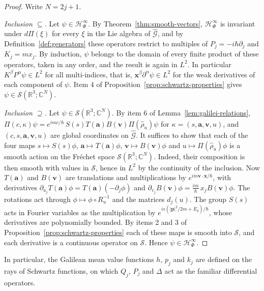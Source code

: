 \begin{proof}
	Write $N=2j+1$.
	
	\emph{Inclusion $\subseteq$.} Let $\psi\in\mathcal{H}^\infty_\Phi$. By Theorem~\ref{thm:smooth-vectors}, $\mathcal{H}^\infty_\Phi$ is invariant under $d\Pi(\xi)$ for every $\xi$ in the Lie algebra of $\widehat{\mathcal{G}}$, and by Definition~\ref{def:generators} these operators restrict to multiples of $P_j=-i\hbar\partial_j$ and $K_j=mx_j$. By induction, $\psi$ belongs to the domain of every finite product of these operators, taken in any order, and the result is again in $L^2$. In particular $K^\beta P^\alpha\psi\in L^2$ for all multi-indices, that is, $\mathbf{x}^\beta\partial^\alpha\psi\in L^2$ for the weak derivatives of each component of $\psi$. Item 4 of Proposition~\ref{prop:schwartz-properties} gives $\psi\in\mathcal{S}(\mathbb{R}^3;\mathbb{C}^N)$.
	
	\emph{Inclusion $\supseteq$.} Let $\psi\in\mathcal{S}(\mathbb{R}^3;\mathbb{C}^N)$. By item 6 of Lemma~\ref{lem:galilei-relations}, $\Pi(c,\kappa)\psi=e^{imc/\hbar}\,S(s)T(\mathbf{a})B(\mathbf{v})\Pi(\hat\rho_u)\psi$ for $\kappa=(s,\mathbf{a},\mathbf{v},u)$, and $(c,s,\mathbf{a},\mathbf{v},u)$ are global coordinates on $\widehat{\mathcal{G}}$. It suffices to show that each of the four maps $s\mapsto S(s)\phi$, $\mathbf{a}\mapsto T(\mathbf{a})\phi$, $\mathbf{v}\mapsto B(\mathbf{v})\phi$ and $u\mapsto\Pi(\hat\rho_u)\phi$ is a smooth action on the Fr\'echet space $\mathcal{S}(\mathbb{R}^3;\mathbb{C}^N)$. Indeed, their composition is then smooth with values in $\mathcal{S}$, hence in $L^2$ by the continuity of the inclusion. Now $T(\mathbf{a})$ and $B(\mathbf{v})$ are translations and multiplications by $e^{im\mathbf{v}\cdot\mathbf{x}/\hbar}$, with derivatives $\partial_{a_j}T(\mathbf{a})\phi=T(\mathbf{a})(-\partial_j\phi)$ and $\partial_{v_j}B(\mathbf{v})\phi=\tfrac{im}{\hbar}\,x_jB(\mathbf{v})\phi$. The rotations act through $\phi\mapsto\phi\circ R_u^{-1}$ and the matrices $d_j(u)$. The group $S(s)$ acts in Fourier variables as the multiplication by $e^{is(|\mathbf{p}|^2/2m+E_0)/\hbar}$, whose derivatives are polynomially bounded. By items 2 and 3 of Proposition~\ref{prop:schwartz-properties} each of these maps is smooth into $\mathcal{S}$, and each derivative is a continuous operator on $\mathcal{S}$. Hence $\psi\in\mathcal{H}^\infty_\Phi$.
\end{proof}

\noindent In particular, the Galilean mean value functions $h$, $p_j$ and $k_j$ are defined on the rays of Schwartz functions, on which $Q_j$, $P_j$ and $\Delta$ act as the familiar differential operators.

